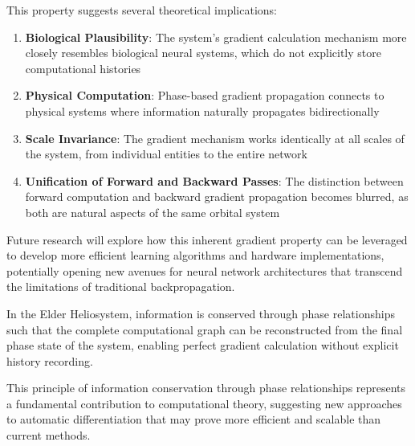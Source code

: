 This property suggests several theoretical implications:

\begin{enumerate}
    \item \textbf{Biological Plausibility}: The system's gradient calculation mechanism more closely resembles biological neural systems, which do not explicitly store computational histories
    \item \textbf{Physical Computation}: Phase-based gradient propagation connects to physical systems where information naturally propagates bidirectionally
    \item \textbf{Scale Invariance}: The gradient mechanism works identically at all scales of the system, from individual entities to the entire network
    \item \textbf{Unification of Forward and Backward Passes}: The distinction between forward computation and backward gradient propagation becomes blurred, as both are natural aspects of the same orbital system
\end{enumerate}

Future research will explore how this inherent gradient property can be leveraged to develop more efficient learning algorithms and hardware implementations, potentially opening new avenues for neural network architectures that transcend the limitations of traditional backpropagation.

\begin{theorem}
In the Elder Heliosystem, information is conserved through phase relationships such that the complete computational graph can be reconstructed from the final phase state of the system, enabling perfect gradient calculation without explicit history recording.
\end{theorem}

This principle of information conservation through phase relationships represents a fundamental contribution to computational theory, suggesting new approaches to automatic differentiation that may prove more efficient and scalable than current methods.